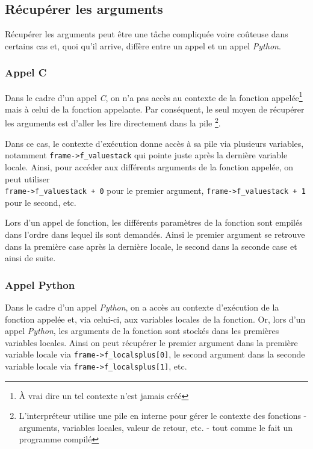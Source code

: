 \subsection{Récupérer les arguments}
Récupérer les arguments peut être une tâche compliquée voire coûteuse dans certains cas et, quoi qu'il arrive, diffère entre un appel \C et un appel \emph{Python}.

\subsubsection*{Appel C}
Dans le cadre d'un appel \emph{C}, on n'a pas accès au contexte de la fonction appelée\footnote{À vrai dire un tel contexte n'est jamais créé} mais à celui de la fonction appelante. Par conséquent, le seul moyen de récupérer les arguments est d'aller les lire directement dans la pile \Python\footnote{L'interpréteur \Python utilise une pile en interne pour gérer le contexte des fonctions - arguments, variables locales, valeur de retour, etc. - tout comme le fait un programme \C compilé}.

Dans ce cas, le contexte d'exécution donne accès à sa pile via plusieurs variables, notamment \verb|frame->f_valuestack| qui pointe juste après la dernière variable locale. Ainsi, pour accéder aux différents arguments de la fonction \C appelée, on peut utiliser\\ \verb|frame->f_valuestack + 0| pour le premier argument, \verb|frame->f_valuestack + 1| pour le second, etc.

\begin{note}
Lors d'un appel de fonction, les différents paramètres de la fonction sont empilés dans l'ordre dans lequel ils sont demandés. Ainsi le premier argument se retrouve dans la première case après la dernière locale, le second dans la seconde case et ainsi de suite.
\end{note}

\subsubsection*{Appel Python}
Dans le cadre d'un appel \emph{Python}, on a accès au contexte d'exécution de la fonction appelée et, via celui-ci, aux variables locales de la fonction. Or, lors d'un appel \emph{Python}, les arguments de la fonction sont stockés dans les premières variables locales. Ainsi on peut récupérer le premier argument dans la première variable locale via \verb|frame->f_localsplus[0]|, le second argument dans la seconde variable locale via \verb|frame->f_localsplus[1]|, etc.

